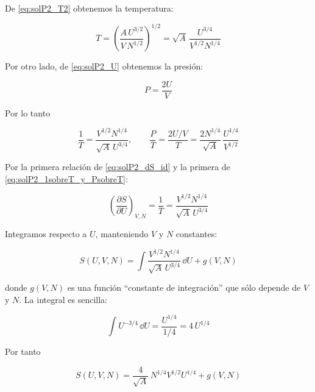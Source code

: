 \documentclass{article}
\begin{document}

De \eqref{eq:solP2_T2} obtenemos la temperatura:

\begin{equation}
T
= \left(\frac{A\,U^{3/2}}{V\,N^{1/2}}\right)^{1/2}
= \sqrt{A}\,\frac{U^{3/4}}{V^{1/2}N^{1/4}}
\label{eq:solP2_T}
\end{equation}

Por otro lado, de \eqref{eq:solP2_U} obtenemos la presión:

\begin{equation}
P
= \frac{2U}{V}
\label{eq:solP2_P}
\end{equation}

Por lo tanto

\begin{equation}
\frac{1}{T}
= \frac{V^{1/2}N^{1/4}}{\sqrt{A}\,U^{3/4}},
\qquad
\frac{P}{T}
= \frac{2U/V}{T}
= \frac{2N^{1/4}}{\sqrt{A}}\,\frac{U^{1/4}}{V^{1/2}}
\label{eq:solP2_1sobreT_y_PsobreT}
\end{equation}


Por la primera relación de \eqref{eq:solP2_dS_id} y la primera de
\eqref{eq:solP2_1sobreT_y_PsobreT}:

\begin{equation}
\left(\frac{\partial S}{\partial U}\right)_{V,N}
= \frac{1}{T}
= \frac{V^{1/2}N^{1/4}}{\sqrt{A}\,U^{3/4}}
\label{eq:solP2_dS_dU}
\end{equation}

Integramos respecto a \(U\), manteniendo \(V\) y \(N\) constantes:

\begin{equation}
S(U,V,N)
= \int \frac{V^{1/2}N^{1/4}}{\sqrt{A}\,U^{3/4}}\,\dd U
  + g(V,N)
\label{eq:solP2_int_U}
\end{equation}

donde \(g(V,N)\) es una función “constante de integración” que sólo
depende de \(V\) y \(N\).  
La integral es sencilla:

\[
\int U^{-3/4}\,\dd U
= \frac{U^{1/4}}{1/4}
= 4\,U^{1/4}
\]

Por tanto

\begin{equation}
S(U,V,N)
= \frac{4}{\sqrt{A}}\,N^{1/4}V^{1/2}U^{1/4}
  + g(V,N)
\label{eq:solP2_S_mas_g}
\end{equation}
\end{document}
